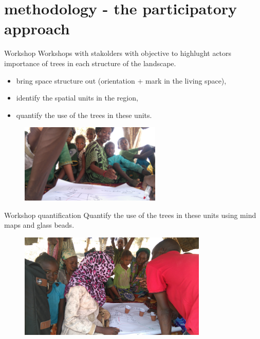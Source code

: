 \documentclass[newPxFont]{beamer}
\begin{document}
\section{methodology - the participatory approach}
\begin{frame}[c]{Workshop}
\vspace{-1cm}
Workshops with stakolders with objective to highlught actors importance of trees
in each structure of the landscape.

\begin{itemize}
  \item bring space structure out (orientation + mark in the living space),
  \item identify the spatial units in the region,
  \item quantify the use of the trees in these units.
\end{itemize}
\begin{figure}
	\centering
	\includegraphics[width = 0.6\textwidth,angle=180]{img/DSC_1789}
\end{figure}
\end{frame}



\begin{frame}[c]{Workshop quantification}
\vspace{-1cm}
Quantify the use of the trees in these units using mind maps and glass beads.

\begin{figure}
  \centering
  \includegraphics[width = 0.8\textwidth]{img/DSC_1793}
\end{figure}

\end{frame}
\end{document}
